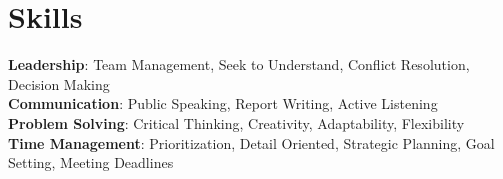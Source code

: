 \documentclass[letterpaper,11pt]{article}
\begin{document}
\section{Skills}
\begin{itemize}[leftmargin=0.15in, label={}]
  \small{\item{
        \textbf{Leadership}{: Team Management, Seek to Understand, Conflict Resolution, Decision Making} \\
        \textbf{Communication}{: Public Speaking, Report Writing, Active Listening} \\
        \textbf{Problem Solving}{: Critical Thinking, Creativity, Adaptability, Flexibility} \\
        \textbf{Time Management}{: Prioritization, Detail Oriented, Strategic Planning, Goal Setting, Meeting Deadlines} \\
        }}
\end{itemize}

\end{document}
